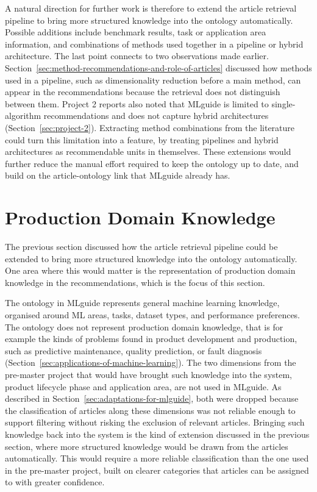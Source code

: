 A natural direction for further work is therefore to extend 
the article retrieval pipeline to bring more structured 
knowledge into the ontology automatically. Possible additions 
include benchmark results, task or application area 
information, and combinations of methods used together in a 
pipeline or hybrid architecture. 
The last point connects to two observations made earlier. 
Section~\ref{sec:method-recommendations-and-role-of-articles} 
discussed how methods used in a pipeline, such as 
dimensionality reduction before a main method, can appear in 
the recommendations because the retrieval does not distinguish 
between them. Project 2 reports also noted that MLguide is 
limited to single-algorithm recommendations and does not 
capture hybrid architectures 
(Section~\ref{sec:project-2}). Extracting method combinations 
from the literature could turn this limitation into a feature, 
by treating pipelines and hybrid architectures as recommendable 
units in themselves. These extensions 
would further reduce the manual effort required to keep the ontology 
up to date, and build on the article-ontology link that MLguide 
already has.

\section{Production Domain Knowledge}
\label{sec:production-domain-knowledge}

The previous section discussed how the article retrieval 
pipeline could be extended to bring more structured knowledge 
into the ontology automatically. One area where this would 
matter is the representation of production domain knowledge in 
the recommendations, which is the focus of this section.

The ontology in MLguide represents general machine learning 
knowledge, organised around ML areas, tasks, dataset types, 
and performance preferences. The ontology does not represent production domain knowledge, 
that is for example the kinds of problems found in product development and 
production, such as predictive maintenance, quality 
prediction, or fault diagnosis 
(Section~\ref{sec:applications-of-machine-learning}). The two 
dimensions from the pre-master project that would have brought 
such knowledge into the system, product lifecycle phase and 
application area, are not used in MLguide. As described in 
Section~\ref{sec:adaptations-for-mlguide}, both were dropped 
because the classification of articles along these dimensions 
was not reliable enough to support filtering without risking 
the exclusion of relevant articles.
Bringing such knowledge back into the 
system is the kind of extension discussed in the previous section, 
where more structured knowledge would be drawn from the articles 
automatically. This would require a more reliable classification than 
the one used in the pre-master project, built on clearer categories 
that articles can be assigned to with greater confidence.

